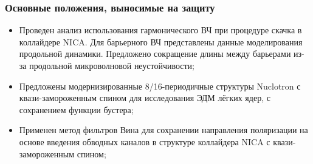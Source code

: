 \begin{frame}
	\frametitle{Основные положения, выносимые на защиту}
	\begin{itemize}
		\item	Проведен анализ использования гармонического ВЧ при процедуре скачка в коллайдере NICA. Для барьерного ВЧ представлены данные моделирования продольной динамики. Предложено сокращение длины между барьерами из-за продольной микроволновой неустойчивости;
		\vspace{1em}
		\item	Предложены модернизированные 8/16-периодичные структуры Nuclotron с квази-замороженным спином для исследования ЭДМ лёгких ядер, с сохранением функции бустера;
		\vspace{1em}
		\item	Применен метод фильтров Вина для сохранении направления поляризации на основе введения обводных каналов в структуре коллайдера NICA с квази-замороженным спином;
	\end{itemize}
\end{frame}
